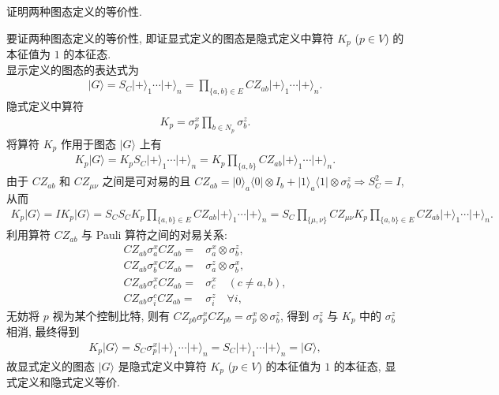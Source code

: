 \documentclass{assignment}
\begin{document}
\begin{prob}
    证明两种图态定义的等价性.
\end{prob}
\begin{pf}
    要证两种图态定义的等价性, 即证显式定义的图态是隐式定义中算符 $K_p$ ($p\in V$) 的本征值为 $1$ 的本征态.\\
    显示定义的图态的表达式为
    \begin{align}
        \lvert G\rangle=S_C\lvert+\rangle_1\cdots\lvert+\rangle_n=\prod_{\{a,b\}\in E}CZ_{ab}\lvert+\rangle_1\cdots\lvert+\rangle_n.
    \end{align}
    隐式定义中算符
    \begin{align}
        K_p=\sigma_p^x\prod_{b\in N_p}\sigma_b^z.
    \end{align}
    将算符 $K_p$ 作用于图态 $\lvert G\rangle$ 上有
    \begin{align}
        K_p\lvert G\rangle=K_pS_C\lvert+\rangle_1\cdots\lvert+\rangle_n=K_p\prod_{\{a,b\}}CZ_{ab}\lvert+\rangle_1\cdots\lvert+\rangle_n.
    \end{align}
    由于 $CZ_{ab}$ 和 $CZ_{\mu\nu}$ 之间是可对易的且 $CZ_{ab}=\lvert 0\rangle_a\langle 0\rvert\otimes I_b+\lvert 1\rangle_a\langle 1\rvert\otimes\sigma_b^z\Longrightarrow S_C^2=I$, 从而
    \begin{align}
        K_p\lvert G\rangle=IK_p\lvert G\rangle=S_CS_CK_p\prod_{\{a,b\}\in E}CZ_{ab}\lvert+\rangle_1\cdots\lvert+\rangle_n=S_C\prod_{\{\mu,\nu\}}CZ_{\mu\nu}K_p\prod_{\{a,b\}\in E}CZ_{ab}\lvert+\rangle_1\cdots\lvert+\rangle_n.
    \end{align}
    利用算符 $CZ_{ab}$ 与 Pauli 算符之间的对易关系:
    \begin{align}
        CZ_{ab}\sigma_a^xCZ_{ab}=&\sigma_a^x\otimes\sigma_b^z,\\
        CZ_{ab}\sigma_b^xCZ_{ab}=&\sigma_a^z\otimes\sigma_b^x,\\
        CZ_{ab}\sigma_c^xCZ_{ab}=&\sigma_c^x\quad(c\neq a,b),\\
        CZ_{ab}\sigma_i^cCZ_{ab}=&\sigma_i^z\quad\forall i,
    \end{align}
    无妨将 $p$ 视为某个控制比特, 则有 $CZ_{pb}\sigma_p^xCZ_{pb}=\sigma_p^x\otimes\sigma_b^z$, 得到 $\sigma_b^z$ 与 $K_p$ 中的 $\sigma_b^z$ 相消, 最终得到
    \begin{align}
        K_p\lvert G\rangle=S_C\sigma_p^x\lvert+\rangle_1\cdots\lvert+\rangle_n=S_C\lvert+\rangle_1\cdots\lvert+\rangle_n=\lvert G\rangle,
    \end{align}
    故显式定义的图态 $\lvert G\rangle$ 是隐式定义中算符 $K_p$ ($p\in V$) 的本征值为 $1$ 的本征态, 显式定义和隐式定义等价.
\end{pf}
\end{document}
